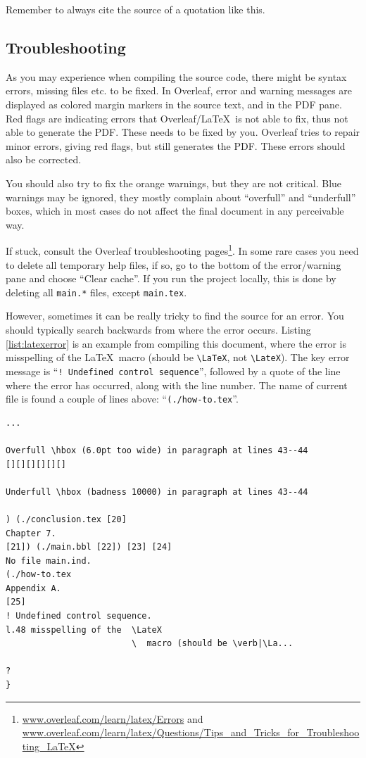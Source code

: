 Remember to always cite the source of a quotation like this.

\subsection{Troubleshooting}

As you may experience when compiling the source code, there might be syntax errors, missing files etc. to be fixed. In Overleaf, error and warning messages are displayed as colored margin markers in the source text, and in the PDF pane. Red flags are indicating errors that Overleaf/\LaTeX\ is not able to fix, thus not able to generate the PDF. These needs to be fixed by you. Overleaf tries to repair minor errors, giving red flags, but still generates the PDF. These errors should also be corrected.

You should also try to fix the orange warnings, but they are not critical. Blue warnings may be ignored, they mostly complain about ``overfull'' and ``underfull'' boxes, which in most cases do not affect the final document in any perceivable way.

If stuck, consult the Overleaf troubleshooting pages\footnote{\url{www.overleaf.com/learn/latex/Errors} and
\url{www.overleaf.com/learn/latex/Questions/Tips_and_Tricks_for_Troubleshooting_LaTeX}}. In some rare cases you need to delete all temporary help files, if so, go to the bottom of the error/warning pane and choose ``Clear cache''. If you run the project locally, this is done by deleting all \texttt{main.*} files, except \texttt{main.tex}.

However, sometimes it can be really tricky to find the source for an error. You should typically search backwards from where the error occurs. Listing \ref{list:latexerror} is an example from compiling this document, where the error is 
misspelling of the \LaTeX\  macro (should be \verb|\LaTeX|, not \verb|\LateX|). The key error message is ``\verb|! Undefined control sequence|'', followed by a quote of the line where the error has occurred, along with the line number. The name of current file is found a couple of lines above: ``\verb|(./how-to.tex|''.

\begin{lstlisting}[float=htpb, caption=\LaTeX\ error output,label=list:latexerror]
...

Overfull \hbox (6.0pt too wide) in paragraph at lines 43--44
[][][][][][]

Underfull \hbox (badness 10000) in paragraph at lines 43--44

) (./conclusion.tex [20]
Chapter 7.
[21]) (./main.bbl [22]) [23] [24]
No file main.ind.
(./how-to.tex
Appendix A.
[25]
! Undefined control sequence.
l.48 misspelling of the  \LateX
                         \  macro (should be \verb|\La...

? 
} 
\end{lstlisting} 



